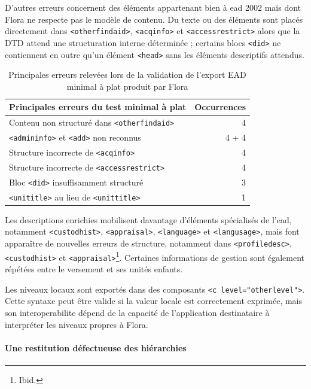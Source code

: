 D'autres erreurs concernent des éléments appartenant bien à \gls{ead} 2002 mais dont Flora ne respecte pas le modèle de contenu. Du texte ou des éléments sont placés directement dans \texttt{<otherfindaid>}, \texttt{<acqinfo>} et \texttt{<accessrestrict>} alors que la DTD attend une structuration interne déterminée ; certains blocs \texttt{<did>} ne contiennent en outre qu'un élément \texttt{<head>} sans les éléments descriptifs attendus.

\begin{table}[htbp]
	\centering
	\small
	\begin{tabular}{p{}r}
		\toprule
		\textbf{Principales erreurs du test minimal à plat} & \textbf{Occurrences} \\
		\midrule
		Contenu non structuré dans \texttt{<otherfindaid>} & 4 \\
		\texttt{<admininfo>} et \texttt{<add>} non reconnus & 4 + 4 \\
		Structure incorrecte de \texttt{<acqinfo>} & 4 \\
		Structure incorrecte de \texttt{<accessrestrict>} & 4 \\
		Bloc \texttt{<did>} insuffisamment structuré & 3 \\
		\texttt{<unititle>} au lieu de \texttt{<unittitle>} & 1 \\
		\bottomrule
	\end{tabular}
	\caption{Principales erreurs relevées lors de la validation de l'export EAD minimal à plat produit par Flora}
	\label{tab:flora-export-ead-minimal}
\end{table}

Les descriptions enrichies mobilisent davantage d'éléments spécialisés de l'\gls{ead}, notamment \texttt{<custodhist>}, \texttt{<appraisal>}, \texttt{<language>} et \texttt{<langusage>}, mais font apparaître de nouvelles erreurs de structure, notamment dans \texttt{<profiledesc>}, \texttt{<custodhist>} et \texttt{<appraisal>}\footnote{Ibid.}. Certaines informations de gestion sont également répétées entre le versement et ses unités enfants.

Les niveaux locaux sont exportés dans des composants \texttt{<c level="otherlevel">}. Cette syntaxe peut être valide si la valeur locale est correctement exprimée, mais son \gls{interoperabilite} dépend de la capacité de l'application destinataire à interpréter les niveaux propres à Flora.

\paragraph{Une restitution défectueuse des hiérarchies}

